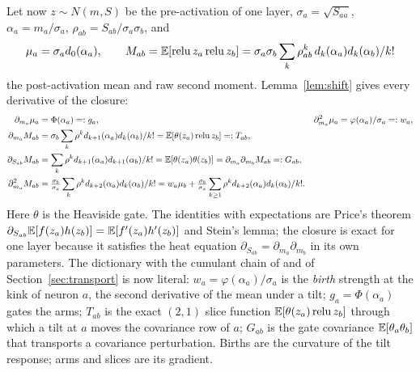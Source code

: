 Let now $z\sim N(m,S)$ be the pre-activation of one layer, $\sigma_a=\sqrt{S_{aa}}$, $\alpha_a=m_a/\sigma_a$,
$\rho_{ab}=S_{ab}/\sigma_a\sigma_b$, and
\[
\mu_a=\sigma_ad_0(\alpha_a),\qquad M_{ab}=\mathbb E[\operatorname{relu} z_a\operatorname{relu} z_b]=\sigma_a\sigma_b\sum_k\rho_{ab}^k\,d_k(\alpha_a)d_k(\alpha_b)/k!
\]
the post-activation mean and raw second moment. Lemma~\ref{lem:shift} gives every derivative of the closure:
\begin{align}
\partial_{m_a}\mu_a&=\Phi(\alpha_a)=:g_a, & \partial_{m_a}^2\mu_a&=\varphi(\alpha_a)/\sigma_a=:w_a,\label{eq:birth}\\
\partial_{m_a}M_{ab}&=\sigma_b\sum_k\rho^kd_{k+1}(\alpha_a)d_k(\alpha_b)/k!=\mathbb E[\theta(z_a)\operatorname{relu} z_b]=:T_{ab},\label{eq:slice}\\
\partial_{S_{ab}}M_{ab}&=\sum_k\rho^kd_{k+1}(\alpha_a)d_{k+1}(\alpha_b)/k!=\mathbb E[\theta(z_a)\theta(z_b)]=\partial_{m_a}\partial_{m_b}M_{ab}=:G_{ab},\label{eq:gate}\\
\partial_{m_a}^2M_{ab}&=\tfrac{\sigma_b}{\sigma_a}\sum_k\rho^kd_{k+2}(\alpha_a)d_k(\alpha_b)/k!=w_a\mu_b+\tfrac{\sigma_b}{\sigma_a}\sum_{k\ge1}\rho^kd_{k+2}(\alpha_a)d_k(\alpha_b)/k!.\label{eq:birth2}
\end{align}
Here $\theta$ is the Heaviside gate. The identities with expectations are Price's theorem
$\partial_{S_{ab}}\mathbb E[f(z_a)h(z_b)]=\mathbb E[f'(z_a)h'(z_b)]$ and Stein's lemma; the closure is exact for one layer
because it satisfies the heat equation $\partial_{S_{ab}}=\partial_{m_a}\partial_{m_b}$ in its own parameters.
The dictionary with the cumulant chain of \cite{Wu} and of Section~\ref{sec:transport} is now literal:
$w_a=\varphi(\alpha_a)/\sigma_a$ is the \emph{birth} strength at the kink of neuron $a$, the second derivative of
the mean under a tilt; $g_a=\Phi(\alpha_a)$ gates the arms; $T_{ab}$ is the exact $(2,1)$ slice function
$\mathbb E[\theta(z_a)\operatorname{relu} z_b]$ through which a tilt at $a$ moves the covariance row of $a$; $G_{ab}$ is the gate
covariance $\mathbb E[\theta_a\theta_b]$ that transports a covariance perturbation. Births are the curvature of the
tilt response; arms and slices are its gradient.

